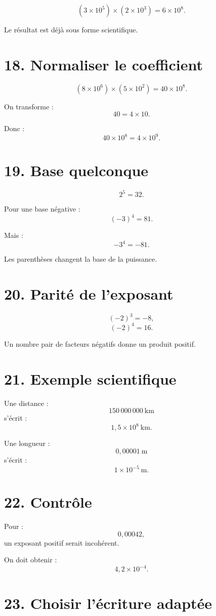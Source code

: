 \[
(3\times10^5)\times(2\times10^3)
=
6\times10^8.
\]

Le résultat est déjà sous forme scientifique.

\section{18. Normaliser le coefficient}

\[
(8\times10^6)\times(5\times10^2)
=
40\times10^8.
\]

On transforme :
\[
40=4\times10.
\]

Donc :
\[
40\times10^8=4\times10^9.
\]

\section{19. Base quelconque}

\[
2^5=32.
\]

Pour une base négative :
\[
(-3)^4=81.
\]

Mais :
\[
-3^4=-81.
\]

Les parenthèses changent la base de la puissance.

\section{20. Parité de l'exposant}

\[
(-2)^3=-8,
\]
\[
(-2)^4=16.
\]

Un nombre pair de facteurs négatifs donne un produit positif.

\section{21. Exemple scientifique}

Une distance :
\[
150\,000\,000\ \text{km}
\]
s'écrit :
\[
1{,}5\times10^8\ \text{km}.
\]

Une longueur :
\[
0{,}00001\ \text{m}
\]
s'écrit :
\[
1\times10^{-5}\ \text{m}.
\]

\section{22. Contrôle}

Pour :
\[
0{,}00042,
\]
un exposant positif serait incohérent.

On doit obtenir :
\[
4{,}2\times10^{-4}.
\]

\section{23. Choisir l'écriture adaptée}

